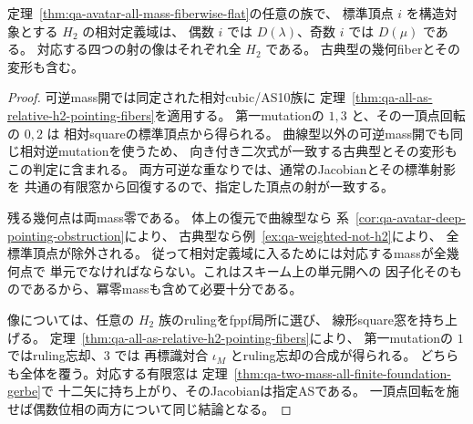 \begin{theorem}
\label{thm:qa-avatar-all-presented-pointing}
定理~\ref{thm:qa-avatar-all-mass-fiberwise-flat}の任意の族で、
標準頂点 $i$ を構造対象とする $H_2$ の相対定義域は、
偶数 $i$ では $D(\lambda)$、奇数 $i$ では $D(\mu)$ である。
対応する四つの射の像はそれぞれ全 $H_2$ である。
古典型の幾何fiberとその変形も含む。
\end{theorem}
\begin{proof}
可逆mass開では同定された相対cubic/AS10族に
定理~\ref{thm:qa-all-as-relative-h2-pointing-fibers}を適用する。
第一mutationの $1,3$ と、その一頂点回転の $0,2$ は
相対squareの標準頂点から得られる。
曲線型以外の可逆mass開でも同じ相対逆mutationを使うため、
向き付き二次式が一致する古典型とその変形もこの判定に含まれる。
両方可逆な重なりでは、通常のJacobianとその標準射影を
共通の有限窓から回復するので、指定した頂点の射が一致する。

残る幾何点は両mass零である。
体上の復元で曲線型なら
系~\ref{cor:qa-avatar-deep-pointing-obstruction}により、
古典型なら例~\ref{ex:qa-weighted-not-h2}により、
全標準頂点が除外される。
従って相対定義域に入るためには対応するmassが全幾何点で
単元でなければならない。これはスキーム上の単元開への
因子化そのものであるから、冪零massも含めて必要十分である。

像については、任意の $H_2$ 族のrulingをfppf局所に選び、
線形square窓を持ち上げる。
定理~\ref{thm:qa-all-as-relative-h2-pointing-fibers}により、
第一mutationの $1$ ではruling忘却、$3$ では
再標識対合 $\iota_M$ とruling忘却の合成が得られる。
どちらも全体を覆う。対応する有限窓は
定理~\ref{thm:qa-two-mass-all-finite-foundation-gerbe}で
十二矢に持ち上がり、そのJacobianは指定ASである。
一頂点回転を施せば偶数位相の両方について同じ結論となる。
\end{proof}

